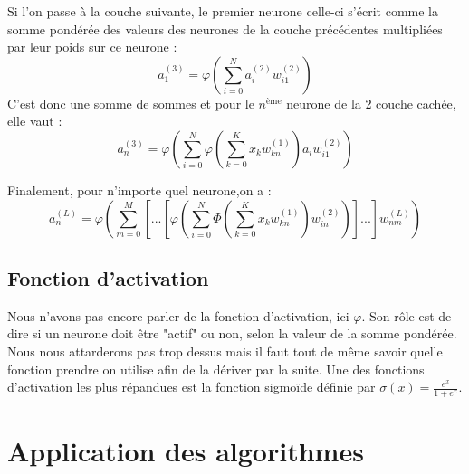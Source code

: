 	\noindent Si l'on passe à la couche suivante, le premier neurone celle-ci s'écrit comme la somme pondérée des valeurs des neurones de la couche précédentes multipliées par leur poids sur ce neurone : 
	$$a_1^{(3)}  = \varphi\left(\sum_{i=0}^{N}a_i^{(2)}w_{i1}^{(2)}\right)$$
	C'est donc une somme de sommes et pour le $n^{\text{ème}}$ neurone de la 2\ieme{} couche cachée, elle vaut :
	$$a_n^{(3)} = \varphi\left(\sum_{i=0}^{N}\varphi\left(\sum_{k=0}^{K}x_kw_{kn}^{(1)}\right)a_i w_{i1}^{(2)}\right)$$
	
	\noindent Finalement, pour n'importe quel neurone,on a :
	$$ a_n^{(L)} = \varphi\left(\sum_{m=0}^{M}\left[...\left[\varphi\left(\sum_{i=0}^{N}\varPhi\left(\sum_{k=0}^{K}x_kw_{kn}^{(1)}\right)w_{in}^{(2)}\right)\right]...\right]w_{nm}^{(L)}\right) $$
	
	
\subsection{Fonction d'activation}
	Nous n'avons pas encore parler de la fonction d'activation, ici $\varphi$. Son rôle est de dire si un neurone doit être "actif" ou non, selon la valeur de la somme pondérée. Nous nous attarderons pas trop dessus mais il faut tout de même savoir quelle fonction prendre on utilise afin de la dériver par la suite. Une des fonctions d'activation les plus répandues est la fonction sigmoïde définie par $\sigma(x) = \frac{e^x}{1+e^x}$.
	
	
\section{Application des algorithmes}